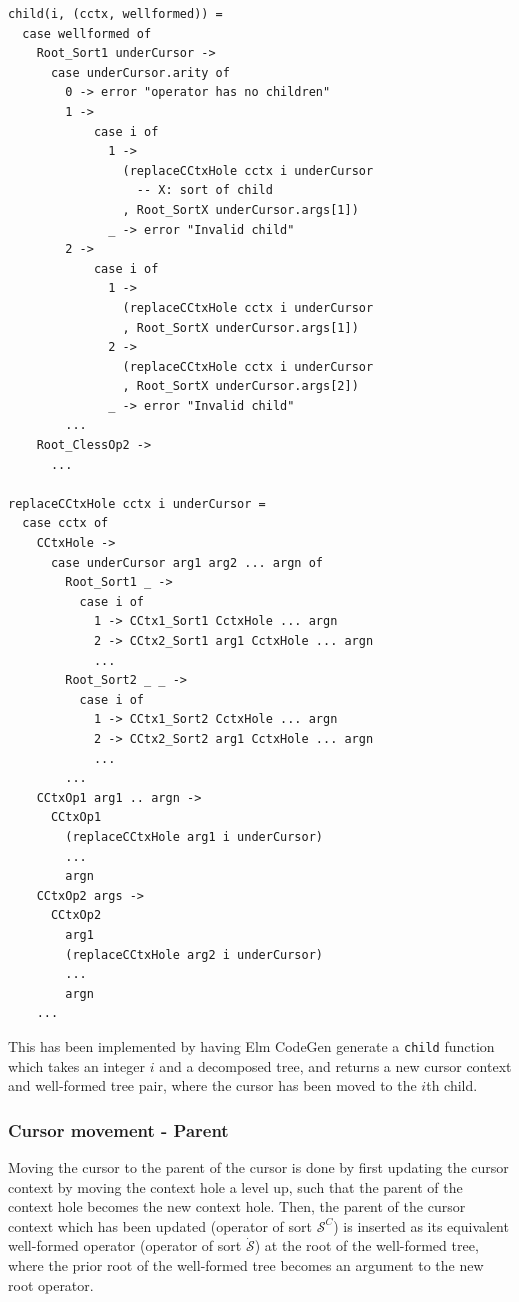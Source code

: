 \begin{lstlisting}[style=inline,caption={Pseudocode for applying child operator},label={lst:cursor-movement-pseudocode}]
child(i, (cctx, wellformed)) =
  case wellformed of
    Root_Sort1 underCursor ->
      case underCursor.arity of
        0 -> error "operator has no children"
        1 -> 
            case i of
              1 -> 
                (replaceCCtxHole cctx i underCursor
                  -- X: sort of child
                , Root_SortX underCursor.args[1])
              _ -> error "Invalid child"
        2 ->
            case i of
              1 -> 
                (replaceCCtxHole cctx i underCursor
                , Root_SortX underCursor.args[1])
              2 -> 
                (replaceCCtxHole cctx i underCursor
                , Root_SortX underCursor.args[2])
              _ -> error "Invalid child"
        ...
    Root_ClessOp2 ->
      ...

replaceCCtxHole cctx i underCursor =
  case cctx of
    CCtxHole ->
      case underCursor arg1 arg2 ... argn of
        Root_Sort1 _ -> 
          case i of
            1 -> CCtx1_Sort1 CctxHole ... argn
            2 -> CCtx2_Sort1 arg1 CctxHole ... argn
            ...  
        Root_Sort2 _ _ ->
          case i of
            1 -> CCtx1_Sort2 CctxHole ... argn
            2 -> CCtx2_Sort2 arg1 CctxHole ... argn
            ...
        ...
    CCtxOp1 arg1 .. argn ->
      CCtxOp1 
        (replaceCCtxHole arg1 i underCursor) 
        ... 
        argn
    CCtxOp2 args ->
      CCtxOp2 
        arg1 
        (replaceCCtxHole arg2 i underCursor) 
        ... 
        argn
    ...
\end{lstlisting}

This has been implemented by having Elm CodeGen generate a \texttt{child} function which
takes an integer $i$ and a decomposed tree, and returns a new cursor context
and well-formed tree pair, where the cursor has been moved to the $i$th child.

\subsubsection{Cursor movement - Parent}

Moving the cursor to the parent of the cursor is done by first updating the cursor context
by moving the context hole a level up, such that the parent of the context hole
becomes the new context hole. Then, the parent of the cursor context which has
been updated (operator of sort $\mathcal{S}^C$) is inserted as its equivalent
well-formed operator (operator of sort $\dot{\mathcal{S}}$) at the root of the
well-formed tree, where the prior root of the well-formed tree becomes an argument to the new root operator.

